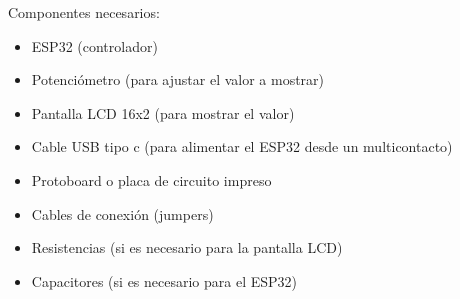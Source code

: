     
    
         Componentes necesarios: 
        \begin{itemize}
    
        \item ESP32 (controlador)
        \item Potenciómetro (para ajustar el valor a mostrar)
        \item Pantalla LCD 16x2 (para mostrar el valor)
        \item Cable USB tipo c (para alimentar el ESP32 desde un multicontacto)
        \item Protoboard o placa de circuito impreso
        \item Cables de conexión (jumpers)
        \item Resistencias (si es necesario para la pantalla LCD)
        \item Capacitores (si es necesario para el ESP32)
    
        \end{itemize}
    
